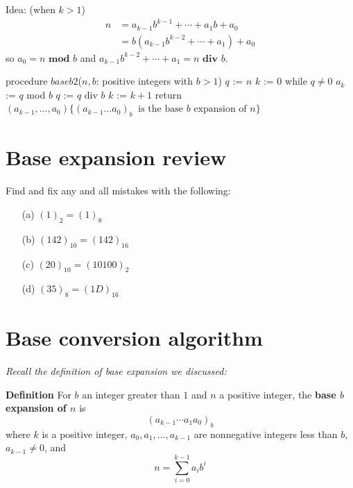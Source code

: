 \documentclass[12pt, oneside]{article}
\begin{document}
\begin{multicols}{2}
  \begin{minipage}{3.2in}
    Idea: {\tiny(when $k > 1$)} 
    \begin{align*}
      n &= a_{k-1} b^{k-1} + \cdots + a_1 b + a_0 \\
        &= b ( a_{k-1} b^{k-2} + \cdots + a_1) + a_0\end{align*}
    so $a_0 = n \textbf{ mod } b$ and $a_{k-1} b^{k-2} + \cdots + a_1 = n \textbf{ div } b$.

\end{minipage}
\columnbreak
\begin{algorithm}[caption={Calculating base $b$ expansion, from right}]
procedure $\textit{baseb2}$($n, b$: positive integers with $b > 1$)
$q$ := $n$
$k$ := $0$
while $q  \neq 0$
  $a_{k}$ := $q$ mod $b$
  $q$ := $q$ div $b$
  $k$ := $k+1$
return $(a_{k-1}, \ldots, a_0) \{(a_{k-1} \ldots a_0)_b~\textrm{ is the base } b \textrm{ expansion of } n \}$
\end{algorithm}
\end{multicols}

\vfill
\vfill \vfill
\section*{Base expansion review}


Find and fix any and all mistakes with the following:
\begin{itemize}
\item[(a)] $(1)_2 = (1)_8$
\item[(b)] $(142)_{10} = (142)_{16}$
\item[(c)] $(20)_{10} = (10100)_2$
\item[(d)] $(35)_8 = (1D)_{16}$
\end{itemize} \vfill
\section*{Base conversion algorithm}


{\it Recall the definition of base expansion we discussed:}



{\bf Definition} For $b$ an integer greater than $1$ and $n$ a positive integer, 
the {\bf base $b$ expansion of $n$}  is
\[
(a_{k-1} \cdots a_1 a_0)_b
\]
where $k$ is a positive integer, $a_0, a_1, \ldots, a_{k-1}$ 
are nonnegative integers less than $b$, $a_{k-1} \neq  0$, and
\[
n =  \sum_{i=0}^{k-1} a_{i} b^{i}
\]
\end{document}
